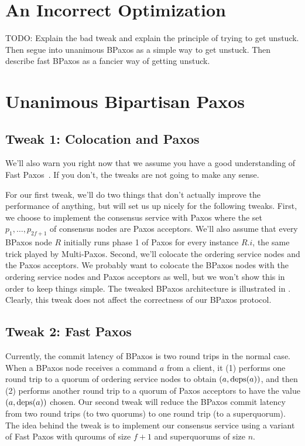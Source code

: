 \documentclass{mwhittaker}
\begin{document}
\section{An Incorrect Optimization}
TODO: Explain the bad tweak and explain the principle of trying to get unstuck.
Then segue into unanimous BPaxos as a simple way to get unstuck. Then describe
fast BPaxos as a fancier way of getting unstuck.

\section{Unanimous Bipartisan Paxos}
\subsection{Tweak 1: Colocation and Paxos}
We'll also warn you right now that we assume you have a good understanding of
Fast Paxos~\cite{lamport2006fast}. If you don't, the tweaks are not going to
make any sense.



For our first tweak, we'll do two things that don't actually improve the
performance of anything, but will set us up nicely for the following tweaks.
First, we choose to implement the consensus service with Paxos where the set
$p_1, \ldots, p_{2f+1}$ of consensus nodes are Paxos acceptors. We'll also
assume that every BPaxos node $R$ initially runs phase 1 of Paxos for every
instance $R.i$, the same trick played by Multi-Paxos. Second, we'll colocate
the ordering service nodes and the Paxos acceptors. We probably want to
colocate the BPaxos nodes with the ordering service nodes and Paxos acceptors
as well, but we won't show this in order to keep things simple.
%
The tweaked BPaxos architecture is illustrated in .
Clearly, this tweak does not affect the correctness of our BPaxos protocol.

{}

\subsection{Tweak 2: Fast Paxos}
Currently, the commit latency of BPaxos is two round trips in the normal case.
When a BPaxos node receives a command $a$ from a client, it (1) performs one
round trip to a quorum of ordering service nodes to obtain $(a, \text{deps}(a))$, and
then (2) performs another round trip to a quorum of Paxos acceptors to have the
value $(a, \text{deps}(a))$ chosen. Our second tweak will reduce the BPaxos commit
latency from two round trips (to two quorums) to one round trip (to a
superquorum). The idea behind the tweak is to implement our consensus service
using a variant of Fast Paxos with quroums of size $f + 1$ and superquorums of
size $n$.
\end{document}
